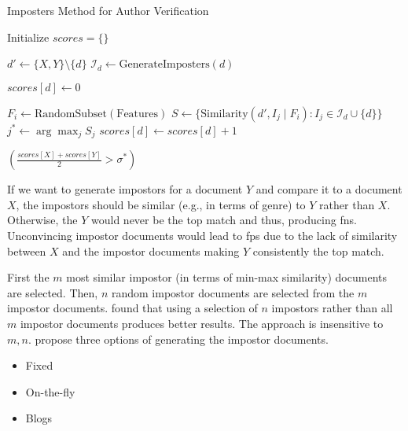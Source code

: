 \begin{algorithm}
    \caption{Imposters Method for Author Verification}
    \label{alg:impostor_algo}
    \begin{algorithmic}[1]
    
        \State Initialize $scores = \{\}$ 
    
            \State $d' \gets \{X, Y\} \setminus \{d\}$ 
            \State $\mathcal{I}_d \gets \text{GenerateImposters}(d)$ 
    
            \State $scores[d] \gets 0$ 
    
                \State $F_i \gets \text{RandomSubset}(\text{Features})$ 
                \State $S \gets \{ \text{Similarity}(d', I_j \mid F_i) : I_j \in \mathcal{I}_d \cup \{d\} \}$ 
                \State $j^* \gets \arg\max_j S_j$ 
                 
                    \State $scores[d] \gets scores[d] + 1$ 

                \EndIf
            \EndFor
        \EndFor
    
        \State \Return $\left( \frac{scores[X] + scores[Y]}{2} > \sigma^* \right)$ 
    \EndProcedure
    \end{algorithmic}
    \end{algorithm}
    
If we want to generate impostors for a document $Y$ and compare it to a document $X$, 
the impostors should be similar (e.g., in terms of genre) to $Y$ rather than $X$.
Otherwise, the $Y$ would never be the top match and thus, producing \acp{fn}.
Unconvincing impostor documents would lead to \acp{fp} due to the lack of similarity between $X$ and the impostor documents making $Y$ consistently the top match.

First the $m$ most similar impostor (in terms of min-max similarity) documents are selected.
Then, $n$ random impostor documents are selected from the $m$ impostor documents.
\citet{koppel_determining_2014} found that using a selection of $n$ impostors rather than all $m$ impostor documents produces better results.
The approach is insensitive to $m,n$.
\citet{koppel_determining_2014} propose three options of generating the impostor documents.
\begin{itemize}
    \item Fixed
    \item On-the-fly
    \item Blogs
\end{itemize}

